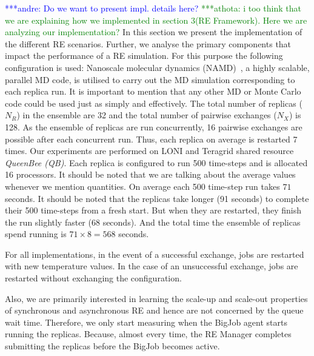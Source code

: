 \documentclass{rspublic}
\newcommand{\alnote}[1]{ {\textcolor{blue} { ***andre: #1 }}}
\newcommand{\athotanote}[1]{ {\textcolor{green} { ***athota: #1 }}}
\newcommand{\alnote}[1]{}
\newcommand{\athotanote}[1]{}
\begin{document}
\alnote{Do we want to present impl. details here?} \athotanote{i too think that we are explaining how we implemented in section 3(RE Framework). Here we are analyzing our implementation?}
In this section we present the implementation of the different RE scenarios. 
Further, we analyse the primary components that impact the performance of a RE
simulation.  For this purpose the following configuration is used:
Nanoscale molecular dynamics (NAMD)~\citep{Phillips:2005gd}, a highly
scalable, parallel MD code, is utilised to carry out the MD simulation
corresponding to each replica run. It is important to mention that any
other MD or Monte Carlo code could be used just as simply and
effectively. The total number of replicas ($N_R$) in the ensemble are
32 and the total number of pairwise exchanges ($N_X$) is 128. As the
ensemble of replicas are run concurrently, 16 pairwise exchanges are
possible after each concurrent run. Thus, each replica on average is
restarted 7 times.  Our experiments are performed on LONI and Teragrid
shared resource \emph{QueenBee (QB)}. Each replica is configured to run 500
time-steps and is allocated 16 processors. It should be noted that we
are talking about the average values whenever we mention
quantities. %
On average each 500 time-step run takes $71$ seconds. 
It should be noted that the replicas take longer (91 seconds) to
complete their 500 time-steps from a fresh start. But when they are
restarted, they finish the run slightly faster (68 seconds).  And the
total time the ensemble of replicas spend running is $71 \times 8 =
568$ seconds.
  
For all implementations, in the event of a successful exchange, jobs
are restarted~\citep{Luckow:2008fp} with new temperature values.  In
the case of an unsuccessful exchange, jobs are restarted without
exchanging the configuration.
 
Also, we are primarily interested in learning the scale-up and
scale-out properties of synchronous and asynchronous RE and hence are
not concerned by the queue wait time. Therefore, we only start
measuring when the BigJob agent starts running the replicas. Because,
almost every time, the RE Manager completes submitting the replicas
before the BigJob becomes active.
\end{document}
